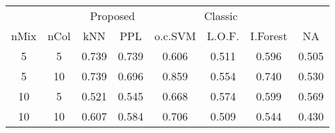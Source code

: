 
\begin{tabular}{cccccccc}
\toprule
\multicolumn{2}{c}{ } & \multicolumn{2}{c}{Proposed} & \multicolumn{3}{c}{Classic} \\
\cmidrule(l{3pt}r{3pt}){3-4} \cmidrule(l{3pt}r{3pt}){5-7}
nMix & nCol & kNN & PPL & o.c.SVM & L.O.F. & I.Forest & NA\\
\midrule
5 & 5 & 0.739 & 0.739 & 0.606 & 0.511 & 0.596 & 0.505\\
5 & 10 & 0.739 & 0.696 & 0.859 & 0.554 & 0.740 & 0.530\\
10 & 5 & 0.521 & 0.545 & 0.668 & 0.574 & 0.599 & 0.569\\
10 & 10 & 0.607 & 0.584 & 0.706 & 0.509 & 0.544 & 0.430\\
\bottomrule
\end{tabular}
